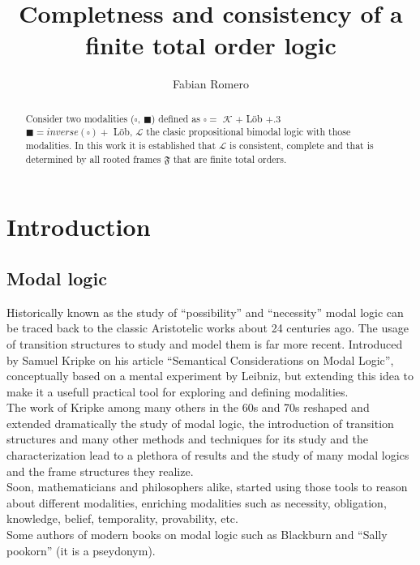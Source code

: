 \documentclass{tufte-handout}
\title{Completness and consistency of a finite total order logic}
\author[Fabian Romero]{Fabian Romero}
\begin{document}
\maketitle

\begin{abstract}
\noindent
Consider two modalities ($\square$, $\blacksquare$) defined as $\square= $ $\mathcal{K}$ $ + $ L\"ob $+ .3 $\\ $\blacksquare = inverse(\square) + $ L\"ob, $\mathcal{L}$ the clasic propositional bimodal logic with those modalities. In this work it is established that $\mathcal{L}$ is consistent, complete and that is determined by all rooted frames $\mathfrak{F}$  that are finite total orders.
\end{abstract}

\section{Introduction}\label{sec:Forewor}
\subsection{Modal logic}\label{sec:lts}

Historically known as the study of ``possibility'' and ``necessity'' modal logic can be traced back to the classic Aristotelic works about 24 centuries ago. The usage of transition structures to study and model them is far more recent. Introduced by Samuel Kripke on his article ``Semantical Considerations on Modal Logic''\cite{Kri63}, conceptually based on a mental experiment by Leibniz, but extending this idea to make it a usefull practical tool for exploring and defining modalities.\\

The work of Kripke among many others in the 60s and 70s reshaped and extended dramatically the study of modal logic, the introduction of transition structures and many other methods and techniques for its study and the characterization lead to a plethora of results and the study of many modal logics and the frame structures they realize.\\

Soon, mathematicians and philosophers alike, started using those tools to reason about different modalities, enriching modalities such as necessity, obligation, knowledge, belief, temporality, provability, etc.\\




Some authors of modern books on modal logic such as Blackburn and ``Sally pookorn'' (it is a pseydonym).
\end{document}
